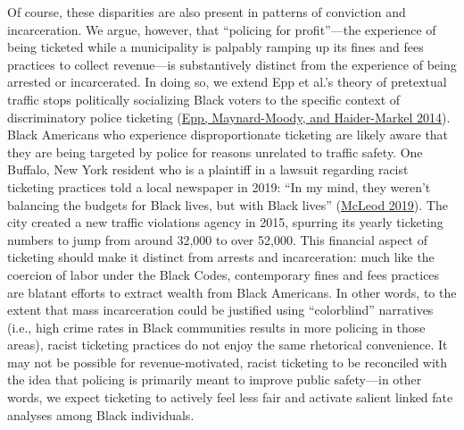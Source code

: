 \documentclass[
  12pt,
]{article}
\begin{document}
Of course, these disparities are also present in patterns of conviction and incarceration. We argue, however, that ``policing for profit''---the experience of being ticketed while a municipality is palpably ramping up its fines and fees practices to collect revenue---is substantively distinct from the experience of being arrested or incarcerated. In doing so, we extend Epp et al.'s theory of pretextual traffic stops politically socializing Black voters to the specific context of discriminatory police ticketing (\protect\hyperlink{ref-Epp2014}{Epp, Maynard-Moody, and Haider-Markel 2014}). Black Americans who experience disproportionate ticketing are likely aware that they are being targeted by police for reasons unrelated to traffic safety. One Buffalo, New York resident who is a plaintiff in a lawsuit regarding racist ticketing practices told a local newspaper in 2019: ``In my mind, they weren't balancing the budgets for Black lives, but with Black lives'' (\protect\hyperlink{ref-McLeod2019}{McLeod 2019}). The city created a new traffic violations agency in 2015, spurring its yearly ticketing numbers to jump from around 32,000 to over 52,000. This financial aspect of ticketing should make it distinct from arrests and incarceration: much like the coercion of labor under the Black Codes, contemporary fines and fees practices are blatant efforts to extract wealth from Black Americans. In other words, to the extent that mass incarceration could be justified using ``colorblind'' narratives (i.e., high crime rates in Black communities results in more policing in those areas), racist ticketing practices do not enjoy the same rhetorical convenience. It may not be possible for revenue-motivated, racist ticketing to be reconciled with the idea that policing is primarily meant to improve public safety---in other words, we expect ticketing to actively feel less fair and activate salient linked fate analyses among Black individuals.
\end{document}
